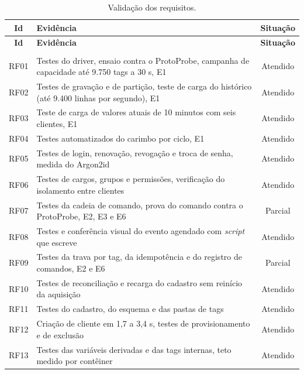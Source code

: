 {\renewcommand{\arraystretch}{1.3}\small
\begin{xltabular}{\textwidth}{cXc}
        \caption{Validação dos requisitos.}
        \label{tab:cap7_requisitos}\\
        \hline
        \textbf{Id} & \textbf{Evidência} & \textbf{Situação} \\
        \hline
        \endfirsthead
        \hline
        \textbf{Id} & \textbf{Evidência} & \textbf{Situação} \\
        \hline
        \endhead
        \endfoot
         \\
        \endlastfoot
        RF01 & Testes do driver, ensaio contra o ProtoProbe, campanha de capacidade até 9.750 tags a 30 s, E1 & Atendido \\
        \hline
        RF02 & Testes de gravação e de partição, teste de carga do histórico (até 9.400 linhas por segundo), E1 & Atendido \\
        \hline
        RF03 & Teste de carga de valores atuais de 10 minutos com seis clientes, E1 & Atendido \\
        \hline
        RF04 & Testes automatizados do carimbo por ciclo, E1 & Atendido \\
        \hline
        RF05 & Testes de login, renovação, revogação e troca de senha, medida do Argon2id & Atendido \\
        \hline
        RF06 & Testes de cargos, grupos e permissões, verificação do isolamento entre clientes & Atendido \\
        \hline
        RF07 & Testes da cadeia de comando, prova do comando contra o ProtoProbe, E2, E3 e E6 & Parcial \\
        \hline
        RF08 & Testes e conferência visual do evento agendado com \emph{script} que escreve & Atendido \\
        \hline
        RF09 & Testes da trava por tag, da idempotência e do registro de comandos, E2 e E6 & Parcial \\
        \hline
        RF10 & Testes de reconciliação e recarga do cadastro sem reinício da aquisição & Atendido \\
        \hline
        RF11 & Testes do cadastro, do esquema e das pastas de tags & Atendido \\
        \hline
        RF12 & Criação de cliente em 1,7 a 3,4 s, testes de provisionamento e de exclusão & Atendido \\
        \hline
        RF13 & Testes das variáveis derivadas e das tags internas, teto medido por contêiner & Atendido \\

\end{xltabular}}
